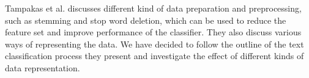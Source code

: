Tampakas et al. discusses different kind of data preparation and preprocessing, such as stemming and stop word deletion, which can be used to reduce the feature set and improve performance of the classifier. They also discuss various ways of representing the data. We have decided to follow the outline of the text classification process they present and investigate the effect of different kinds of data representation. \cite{Ikonomakis05TextClassification}